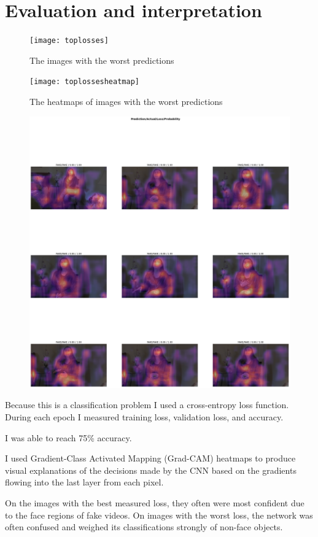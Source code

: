 \documentclass[12pt,letterpaper]{hmcpset}
\begin{document}
\section{Evaluation and interpretation}
\begin{figure}
    \texttt{[image: toplosses]}
    \caption{The images with the worst predictions}
\end{figure}
\begin{figure}
    \texttt{[image: toplossesheatmap]}
    \caption{The heatmaps of images with the worst predictions}
\end{figure}
\begin{figure}
    \includegraphics[width=\textwidth]{lowlossheatmap}
\end{figure}
Because this is a classification problem I used a cross-entropy loss function.
During each epoch I measured training loss, validation loss, and accuracy.

I was able to reach 75\% accuracy.

I used Gradient-Class Activated Mapping (Grad-CAM) heatmaps to produce visual explanations of the decisions made by the CNN based on the gradients flowing into the last layer from each pixel.

On the images with the best measured loss, they often were most confident due to the face regions of fake videos. On images with the worst loss, the network was often confused and weighed its classifications strongly of non-face objects.
\end{document}
